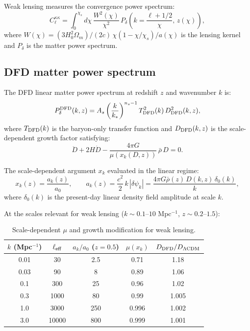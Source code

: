 \documentclass[11pt]{article}
\begin{document}
Weak lensing measures the convergence power spectrum:
\begin{equation}
C_\ell^{\kappa\kappa} = \int_0^{\chi_s} d\chi\,\frac{W^2(\chi)}{\chi^2}\,P_\delta\!\left(k = \frac{\ell+1/2}{\chi},\, z(\chi)\right),
\end{equation}
where $W(\chi) = (3H_0^2\Omega_m)/(2c)\,\chi(1-\chi/\chi_s)/a(\chi)$ is the lensing kernel and $P_\delta$ is the matter power spectrum.

\subsection{DFD matter power spectrum}

The DFD linear matter power spectrum at redshift $z$ and wavenumber $k$ is:
\begin{equation}
P_\delta^{\rm DFD}(k,z) = A_s\left(\frac{k}{k_*}\right)^{n_s - 1} T_{\rm DFD}^2(k)\,D_{\rm DFD}^2(k,z),
\end{equation}
where $T_{\rm DFD}(k)$ is the baryon-only transfer function and $D_{\rm DFD}(k,z)$ is the scale-dependent growth factor satisfying:
\begin{equation}\label{eq:growth-k}
\ddot{D} + 2H\dot{D} - \frac{4\pi G}{\mu(x_k(D,z))}\,\bar\rho\,D = 0.
\end{equation}

The scale-dependent argument $x_k$ evaluated in the linear regime:
\begin{equation}
x_k(z) = \frac{a_k(z)}{a_0}, \qquad a_k(z) = \frac{c^2}{2}\,k\,|\delta\psi_k| = \frac{4\pi G\bar\rho(z)\,D(k,z)\,\delta_0(k)}{k},
\end{equation}
where $\delta_0(k)$ is the present-day linear density field amplitude at scale $k$.

At the scales relevant for weak lensing ($k \sim 0.1$--$10$ Mpc$^{-1}$, $z \sim 0.2$--$1.5$):

\begin{table}[h]
\centering
\caption{Scale-dependent $\mu$ and growth modification for weak lensing.}
\begin{tabular}{ccccc}
\toprule
$k$ (Mpc$^{-1}$) & $\ell_{\rm eff}$ & $a_k/a_0$ ($z=0.5$) & $\mu(x_k)$ & $D_{\rm DFD}/D_{\Lambda\rm CDM}$ \\
\midrule
0.01 & 30 & 2.5 & 0.71 & 1.18 \\
0.03 & 90 & 8 & 0.89 & 1.06 \\
0.1 & 300 & 25 & 0.96 & 1.02 \\
0.3 & 1000 & 80 & 0.99 & 1.005 \\
1.0 & 3000 & 250 & 0.996 & 1.002 \\
3.0 & 10000 & 800 & 0.999 & 1.001 \\
\bottomrule
\end{tabular}
\label{tab:mu-lensing}
\end{table}
\end{document}
